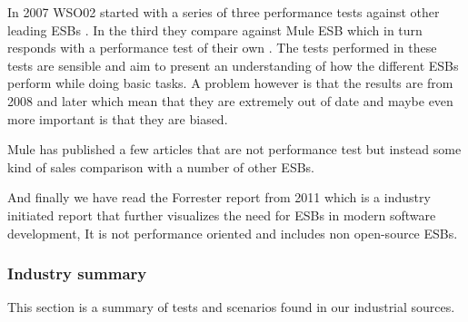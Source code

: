 In 2007 WSO02 started with a series of three performance tests against other leading ESBs \cite{Perera07,Perera07R2,Perera07R3}. In the third they compare against Mule ESB which in turn responds with a performance test of their own \cite{mulesoft08}. The tests performed in these tests are sensible and aim to present an understanding of how the different ESBs perform while doing basic tasks. A problem however is that the results are from 2008 and later which mean that they are extremely out of date and maybe even more important is that they are biased.


Mule has published a few articles that are not performance test but instead some kind of sales comparison with a number of other ESBs\cite{mulevsjboss,mulevsglassfish,mulevsservicemix}.

And finally we have read the Forrester report \cite{forrester11} from 2011 which is a industry initiated report that further visualizes the need for ESBs in modern software development, It is not performance oriented and includes non open-source ESBs.

\subsubsection{Industry summary}
This section is a summary of tests and scenarios found in our industrial sources.

